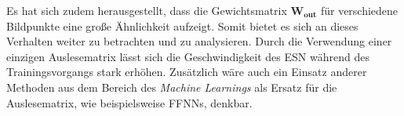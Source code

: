 Es hat sich zudem herausgestellt, dass die Gewichtsmatrix $\mathbf{W_{out}}$ für verschiedene Bildpunkte eine große Ähnlichkeit aufzeigt. Somit bietet es sich an dieses Verhalten weiter zu betrachten und zu analysieren. Durch die Verwendung einer einzigen Auslesematrix lässt sich die Geschwindigkeit des \textsc{ESN} während des Trainingsvorgangs stark erhöhen. Zusätzlich wäre auch ein Einsatz anderer Methoden aus dem Bereich des \textit{Machine Learnings} als Ersatz für die Auslesematrix, wie beispielsweise \textsc{FFNN}s, denkbar.  